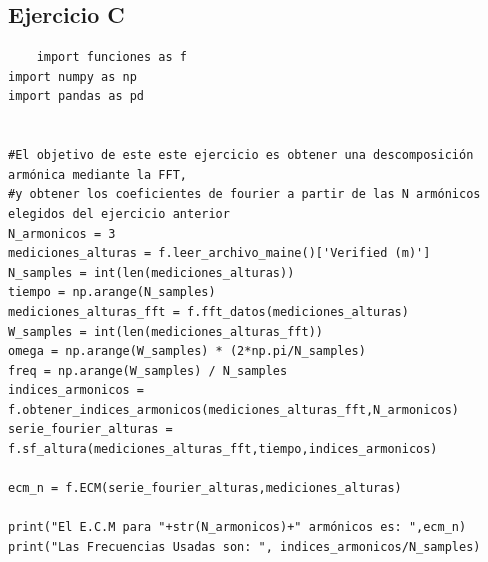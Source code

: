 \documentclass[10pt,a4paper]{article}
\numberwithin{equation}{section}
\numberwithin{figure}{section}
\numberwithin{table}{section}
\begin{document}
\subsection{Ejercicio C}
\begin{verbatim}
    import funciones as f
import numpy as np
import pandas as pd


#El objetivo de este este ejercicio es obtener una descomposición armónica mediante la FFT, 
#y obtener los coeficientes de fourier a partir de las N armónicos elegidos del ejercicio anterior
N_armonicos = 3
mediciones_alturas = f.leer_archivo_maine()['Verified (m)']
N_samples = int(len(mediciones_alturas))
tiempo = np.arange(N_samples)
mediciones_alturas_fft = f.fft_datos(mediciones_alturas)
W_samples = int(len(mediciones_alturas_fft))
omega = np.arange(W_samples) * (2*np.pi/N_samples)
freq = np.arange(W_samples) / N_samples
indices_armonicos = f.obtener_indices_armonicos(mediciones_alturas_fft,N_armonicos)
serie_fourier_alturas = f.sf_altura(mediciones_alturas_fft,tiempo,indices_armonicos)

ecm_n = f.ECM(serie_fourier_alturas,mediciones_alturas)

print("El E.C.M para "+str(N_armonicos)+" armónicos es: ",ecm_n)
print("Las Frecuencias Usadas son: ", indices_armonicos/N_samples)
\end{verbatim}
\end{document}
